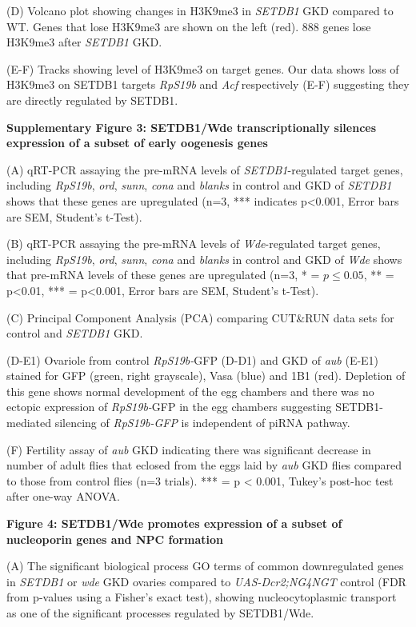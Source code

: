 \documentclass[12pt,oneside]{reedthesis}
\begin{document}
(D) Volcano plot showing changes in H3K9me3 in \emph{SETDB1} GKD compared to
WT. Genes that lose H3K9me3 are shown on the left (red). 888 genes lose
H3K9me3 after \emph{SETDB1} GKD.

(E-F) Tracks showing level of H3K9me3 on target genes. Our data shows
loss of H3K9me3 on SETDB1 targets \emph{RpS19b} and \emph{Acf} respectively (E-F)
suggesting they are directly regulated by SETDB1.

\textbf{Supplementary Figure 3: SETDB1/Wde transcriptionally silences
expression of a subset of early oogenesis genes}

(A) qRT-PCR assaying the pre-mRNA levels of \emph{SETDB1}-regulated target
genes, including \emph{RpS19b}, \emph{ord}, \emph{sunn}, \emph{cona} and \emph{blanks} in control
and GKD of \emph{SETDB1} shows that these genes are upregulated (n=3, ***
indicates p\textless0.001, Error bars are SEM, Student's t-Test).

(B) qRT-PCR assaying the pre-mRNA levels of \emph{Wde}-regulated target
genes, including \emph{RpS19b}, \emph{ord}, \emph{sunn}, \emph{cona} and \emph{blanks} in control
and GKD of \emph{Wde} shows that pre-mRNA levels of these genes are
upregulated (n=3, * = \(p \le 0.05\), ** = p\textless0.01, *** = p\textless0.001,
Error bars are SEM, Student's t-Test).

(C) Principal Component Analysis (PCA) comparing CUT\&RUN data sets for
control and \emph{SETDB1} GKD.

(D-E1) Ovariole from control \emph{RpS19b-}GFP (D-D1) and GKD of \emph{aub} (E-E1)
stained for GFP (green, right grayscale), Vasa (blue) and 1B1 (red).
Depletion of this gene shows normal development of the egg chambers and
there was no ectopic expression of \emph{RpS19b-}GFP in the egg chambers
suggesting SETDB1-mediated silencing of \emph{RpS19b-GFP} is independent of
piRNA pathway.

(F) Fertility assay of \emph{aub} GKD indicating there was significant
decrease in number of adult flies that eclosed from the eggs laid by
\emph{aub} GKD flies compared to those from control flies (n=3 trials).
*** = p \textless{} 0.001, Tukey's post-hoc test after one-way ANOVA.

\textbf{Figure 4: SETDB1/Wde promotes expression of a subset of nucleoporin
genes and NPC formation}

(A) The significant biological process GO terms of common downregulated
genes in \emph{SETDB1} or \emph{wde} GKD ovaries compared to \emph{UAS-Dcr2;NG4NGT}
control (FDR from p-values using a Fisher's exact test), showing
nucleocytoplasmic transport as one of the significant processes
regulated by SETDB1/Wde.
\end{document}
